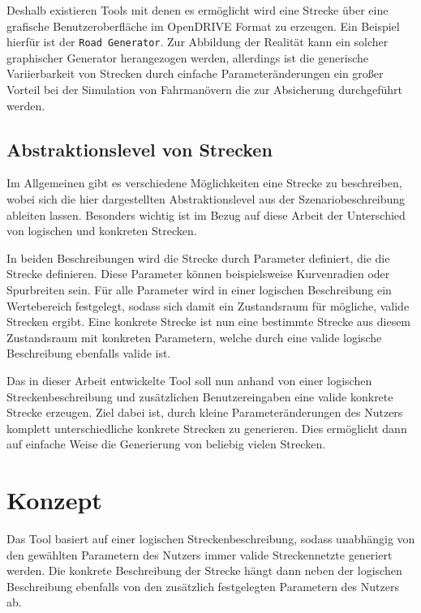 Deshalb existieren Tools mit denen es ermöglicht wird eine Strecke über eine grafische Benutzeroberfläche im OpenDRIVE Format zu erzeugen. Ein Beispiel hierfür ist der \texttt{Road Generator}.\cite{RoadGenerator.2019} Zur Abbildung der Realität kann ein solcher graphischer Generator herangezogen werden, allerdings ist die generische Variierbarkeit von Strecken durch einfache Parameteränderungen ein großer Vorteil bei der Simulation von Fahrmanövern die zur Absicherung durchgeführt werden. 

\section{Abstraktionslevel von Strecken}

Im Allgemeinen gibt es verschiedene Möglichkeiten eine Strecke zu beschreiben, wobei sich die hier dargestellten Abstraktionslevel aus der Szenariobeschreibung ableiten lassen. Besonders wichtig ist im Bezug auf diese Arbeit der Unterschied von logischen und konkreten Strecken.

In beiden Beschreibungen wird die Strecke durch Parameter definiert, die die Strecke definieren. Diese Parameter können beispielsweise Kurvenradien oder Spurbreiten sein. Für alle Parameter wird in einer logischen Beschreibung ein Wertebereich festgelegt, sodass sich damit ein Zustandsraum für mögliche, valide Strecken ergibt. Eine konkrete Strecke ist nun eine bestimmte Strecke aus diesem Zustandsraum mit konkreten Parametern, welche durch eine valide logische Beschreibung ebenfalls valide ist.\cite{Szenarienbeschreibung.2019}

Das in dieser Arbeit entwickelte Tool soll nun anhand von einer logischen Streckenbeschreibung und zusätzlichen Benutzereingaben eine valide konkrete Strecke erzeugen. Ziel dabei ist, durch kleine Parameteränderungen des Nutzers komplett unterschiedliche konkrete Strecken zu generieren. Dies ermöglicht dann auf einfache Weise die Generierung von beliebig vielen Strecken.

\chapter {Konzept}

Das Tool basiert auf einer logischen Streckenbeschreibung, sodass unabhängig von den gewählten Parametern des Nutzers immer valide Streckennetzte generiert werden. Die konkrete Beschreibung der Strecke hängt dann neben der logischen Beschreibung ebenfalls von den zusätzlich festgelegten Parametern des Nutzers ab. 

